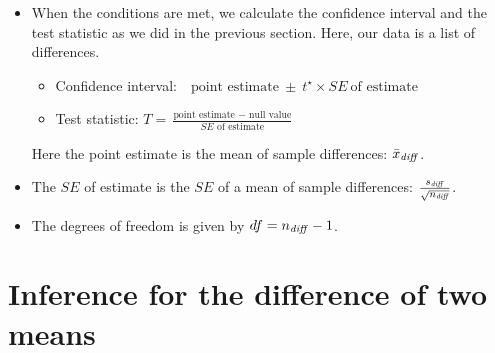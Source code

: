 \begin{itemize}
\item When the conditions are met, we calculate the confidence interval and the test statistic as we did in the previous section.  Here, our data is a list of differences.

\begin{itemize}
\setlength{\itemsep}{2mm}
\item[] Confidence interval:\ \  $\text{point estimate}\ \pm\ t^{\star} \times SE\ \text{of estimate}$
\item[] Test statistic:  $T = \frac{\text{point estimate } - \text{ null value}}{SE \text{ of estimate}}$ 
\end{itemize}
Here the point estimate is the mean of sample differences: $\bar{x}_{\text{\emph{diff}}}$.
\item[] The $SE$ of estimate is the $SE$ of a mean of sample differences: $\frac{s_{\text{\emph{diff}}}}{\sqrt{n_{\text{\emph{diff}}}}}$.
\item[] The degrees of freedom is given by $df = n_{\text{\emph{diff}}}-1$.

\end{itemize}


{}

\section[Inference for the difference of two means]{Inference for the difference of two means}
\label{theTDistributionForTheDifferenceOfTwoMeans}%

